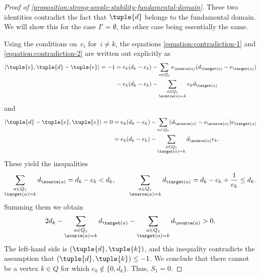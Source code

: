 \begin{proof}[Proof of \cref{proposition:strong-ample-stability-fundamental-domain}]
These two identities contradict the fact that $\tuple{d}$ belongs to the fundamental domain.
We will show this for the case $I' = \emptyset$, the other case being essentially the same.

Using the conditions on~$e_i$ for~$i\neq k$,
the equations \eqref{equation:contradiction-1} and \eqref{equation:contradiction-2} are written out explicitly as\vspace*{-3pt}
\begin{equation*}
\begin{aligned}
\langle \tuple{e}, \tuple{d} - \tuple{e} \rangle = -1
&= e_k(d_k - e_k) - \sum_{a \in Q_1}e_{\source(a)}(d_{\target(a)} - e_{\target(a)}) \\
&= e_k(d_k - e_k) - \sum_{\substack{a\in Q_1 \\ \source(a)=k}} e_{k} d_{\target(a)}
\end{aligned}
\end{equation*}
and\vspace*{-3pt}
\begin{equation*}
\begin{aligned}
\langle \tuple{d} - \tuple{e}, \tuple{e} \rangle = 0
&= e_k(d_k - e_k) - \sum_{a \in Q_1}(d_{\source(a)} - e_{\source(a)})e_{\target(a)} \\
&= e_k(d_k - e_k) - \sum_{\substack{a\in Q_1 \\ \target(a)=k}} d_{\source(a)} e_{k}.
\end{aligned}
\end{equation*}
These yield the inequalities\vspace*{-3pt}
\begin{equation*}
\sum_{\substack{a\in Q_1 \\ \target(a)=k}} d_{\source(a)} = d_k - e_k < d_k, \qquad
\sum_{\substack{a\in Q_1 \\ \source(a)=k}} d_{\target(a)} = d_k - e_k + \frac{1}{e_k} \leq d_k.
\end{equation*}
Summing them we obtain\vspace*{-3pt}
\begin{equation*}
2d_k - \sum_{\substack{a\in Q_1 \\ \source(a)=k}} d_{\target(a)} - \sum_{\substack{a\in Q_1\\\target(a)=k}} d_{\source(a)} > 0.
\end{equation*}
The left-hand side is $(\tuple{d},\tuple{k})$, and
this inequality contradicts the assumption that $(\tuple{d},\tuple{k}) \leq -1$.
We conclude that there cannot be a vertex $k \in Q$ for which $e_k \notin \{0,d_k\}$.
Thus, $S_1 = 0$.


\end{proof}
